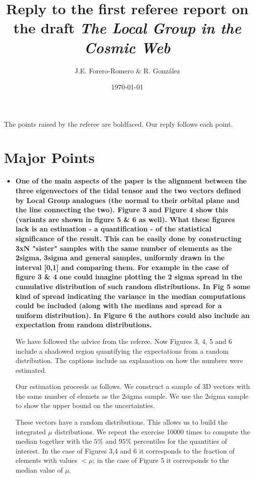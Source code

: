 \documentclass{article}
\title{Reply to the first referee report on the draft {\it The Local Group in the Cosmic Web}}
\author{J.E. Forero-Romero \& R. Gonz\'alez}
\date{\today}
\begin{document}
\maketitle

The points raised by the referee are boldfaced. Our reply follows each point.


\section{Major Points}

\begin{itemize}

\item
{\bf One of the main aspects of the paper is the alignment between the
  three eigenvectors of the tidal tensor and the two vectors defined
  by Local Group analogues (the normal to their orbital plane and the
  line connecting the two). Figure 3 and Figure 4 show this (variants
  are shown in figure 5 \& 6 as well). What these figures lack is an
  estimation - a quantification - of the statistical significance of
  the result. This can be easily done by constructing 3xN "sister"
  samples with the same number of elements as the 2sigma, 3sigma and
  general samples, uniformly drawn in the interval [0,1] and comparing
  them. For example in the case of figure 3 \& 4 one could imagine
  plotting the 2 sigma spread in the cumulative distribution of such
  random distributions. In Fig 5 some kind of spread indicating the
  variance in the median computations could be included (along with
  the medians and spread for a uniform distribution). In Figure 6 the
  authors could also include an expectation from random
  distributions.}  

We have followed the advice from the referee. Now Figures 3, 4, 5 and
6 include a shadowed region quantifying the expectations from a random
distribution. The captions include an explanation on how the numbers
were estimated. 

Our estimation proceeds as follows. We construct a sample of 3D
vectors with the same number of elemets as the 2sigma sample. We use
the 2sigma sample to show the upper bound on the uncertainties.  

These vectors have a random distributions. This allows us to build the
integrated $\mu$ distributions. We repeat the exercise 10000 times to
compute the median together with the $5\%$ and $95\%$ percentiles for
the quantities of interest. In the case of Figures 3,4 and 6 it
corresponds to the fraction of elements with values $<\mu$; in the
case of Figure 5 it corresponds to the median value of $\mu$. 


\end{itemize}
\end{document}
